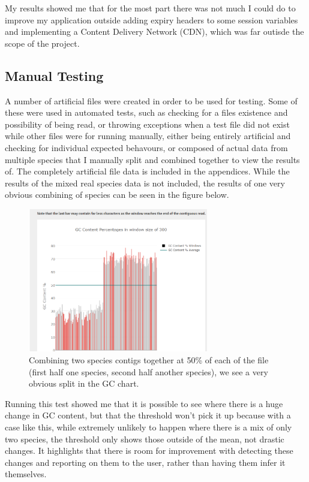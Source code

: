 My results showed me that for the most part there was not much I could do to improve my application outside adding expiry headers to some session variables and implementing a Content Delivery Network (CDN), which was far outisde the scope of the project.

\subsection{Manual Testing}
A number of artificial files were created in order to be used for testing. Some of these were used in automated tests, such as checking for a files existence and possibility of being read, or throwing exceptions when a test file did not exist while other files were for running manually, either being entirely artificial and checking for individual expected behavours, or composed of actual data from multiple species that I manually split and combined together to view the results of. The completely artificial file data is included in the appendices. While the results of the mixed real species data is not included, the results of one very obvious combining of species can be seen in the figure below.

\begin{figure}[H]
\centering
\includegraphics[width=0.7\textwidth]{images/combinedspecies}
\caption{Combining two species contigs together at 50\% of each of the file (first half one species, second half another species), we see a very obvious split in the GC chart.}
\end{figure}

Running this test showed me that it is possible to see where there is a huge change in GC content, but that the threshold won't pick it up because with a case like this, while extremely unlikely to happen where there is a mix of only two species, the threshold only shows those outside of the mean, not drastic changes. It highlights that there is room for improvement with detecting these changes and reporting on them to the user, rather than having them infer it themselves.

